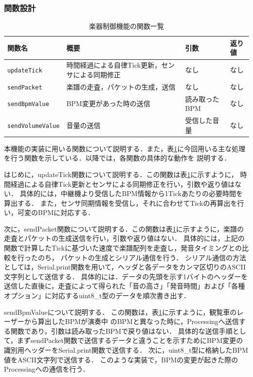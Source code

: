 \documentclass[lualatex,book,paper=a4paper,jafontsize=11.5pt,jafontscale=1.05]{jlreq}
\begin{document}
\subsubsection{関数設計}
\begin{table}[bt]
    \vspace{-1em}
    \caption{楽器制御機能の関数一覧}
    \centering
    \label{tab:func2}
    \begin{tabularx}{\textwidth}{lXXl}
    \hline
    \textbf{関数名} & \textbf{概要} & \textbf{引数} & \textbf{返り値}\\
    \hline
    \texttt{updateTick} & 時間経過による自律Tick更新，センサによる同期修正 & なし & なし\\
    \hline
    \texttt{sendPacket} & 楽譜の走査，パケットの生成，送信 & なし & なし\\
    \hline
    \texttt{sendBpmValue} & BPM変更があった時の送信 & 読み取ったBPM & なし \\
    \hline
    \texttt{sendVolumeValue} & 音量の送信 & 受信した音量 & なし \\
    \hline
    \end{tabularx}
\end{table}

本機能の実装に用いる関数について説明する．また，表\ref{tab:func2}に今回用いる主な処理を行う関数を示している．以降では，各関数の具体的な動作を
説明する．\par
はじめに，updateTick関数について説明する．この関数は表\ref{tab:func2}に示すように，
時間経過による自律Tick更新とセンサによる同期修正を行い，引数や返り値はない．
具体的には，中継機より受信したBPM情報から1Tickあたりの必要時間を算出する．
また，センサ同期情報を受信し，それに合わせてTickの再算出を行い，可変のBPMに対応する．\par

次に，sendPacket関数について説明する．この関数は表\ref{tab:func2}に示すように，楽譜の走査とパケットの生成送信を行い，引数や返り値はない．
具体的には，上記の関数で計算したTickに基づいた速度で楽譜配列を走査し，発音タイミングとの比較を行ったのち，
パケットの生成とシリアル通信を行う．
シリアル通信の方法としては，Serial.print関数を用いて，ヘッダと各データをカンマ区切りのASCII文字列として送信する．
具体的には．データの先頭を示す1バイトのヘッダーを送信した直後に，走査によって得られた「音の高さ」「発音時間」および「各種オプション」に対応するuint8\_t型のデータを順次書き出す．

sendBpmValueについて説明する．
この関数は，表\ref{tab:func2}に示すように，観覧車のレーザーから算出したBPMが演奏中
のBPMと異なった時に，Processingへ送信する関数であり，引数は読み取ったBPMで戻り値はない．
具体的な送信手順として，まずsendPacket関数で送信するデータと違うことを示すためにBPM変更の識別用ヘッダーをSerial.print関数で送信する．
次に，uint8\_t型に格納したBPM値をASCII文字列で送信する．
このような実装で，BPMの変更が起きた際のProcessingへの通信を行う．
\end{document}
